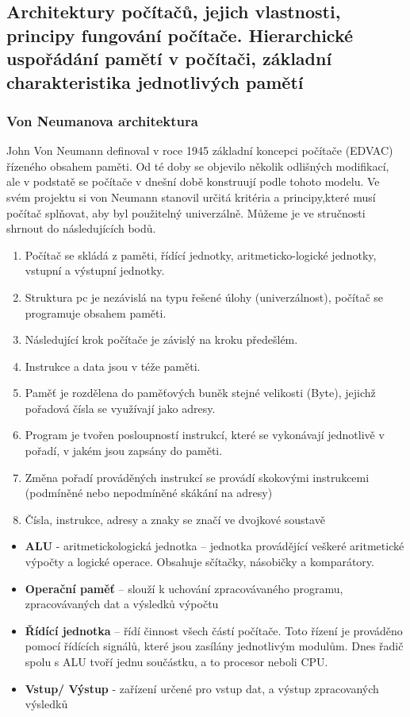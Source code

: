 \subsection[Architektura počítače, Hierarchie uspořádání paměti]{Architektury počítačů, jejich vlastnosti, principy fungování počítače. Hierarchické uspořádání pamětí v počítači, základní charakteristika jednotlivých pamětí}
\subsubsection{Von Neumanova architektura}
John Von Neumann definoval v roce 1945 základní koncepci počítače (EDVAC) řízeného obsahem paměti. Od té doby se objevilo několik odlišných modifikací, ale v podstatě se počítače v dnešní době konstruují podle tohoto modelu. Ve svém projektu si von Neumann stanovil určitá kritéria a principy,které musí počítač splňovat, aby byl použitelný univerzálně. Můžeme je ve stručnosti shrnout do následujících bodů.
\begin{enumerate}
\item Počítač se skládá z paměti, řídící jednotky, aritmeticko-logické jednotky, vstupní a výstupní jednotky.
\item Struktura pc je nezávislá na typu řešené úlohy (univerzálnost), počítač se programuje obsahem paměti.
\item Následující krok počítače je závislý na kroku předešlém.
\item Instrukce a data jsou v téže paměti.
\item Paměť je rozdělena do paměťových buněk stejné velikosti (Byte), jejichž pořadová čísla se využívají jako adresy.
\item Program je tvořen posloupností instrukcí, které se vykonávají jednotlivě v pořadí, v jakém jsou zapsány do paměti.
\item Změna pořadí prováděných instrukcí se provádí skokovými instrukcemi (podmíněné nebo nepodmíněné skákání na adresy)  
\item Čísla, instrukce, adresy a znaky se značí ve dvojkové soustavě
\end{enumerate}


\begin{itemize}
\item \textbf{ALU} - aritmetickologická jednotka -- jednotka provádějící veškeré aritmetické výpočty a logické operace. Obsahuje sčítačky, násobičky a komparátory.
\item \textbf{Operační paměť} -- slouží k uchování zpracovávaného programu, zpracovávaných dat a výsledků výpočtu
\item \textbf{Řídící jednotka} -- řídí činnost všech částí počítače. Toto řízení je prováděno pomocí řídících signálů, které jsou zasílány jednotlivým modulům. Dnes řadič spolu s ALU tvoří jednu součástku, a to procesor neboli CPU.
\item \textbf{Vstup/ Výstup} - zařízení určené pro vstup dat, a výstup zpracovaných výsledků
\end{itemize}

